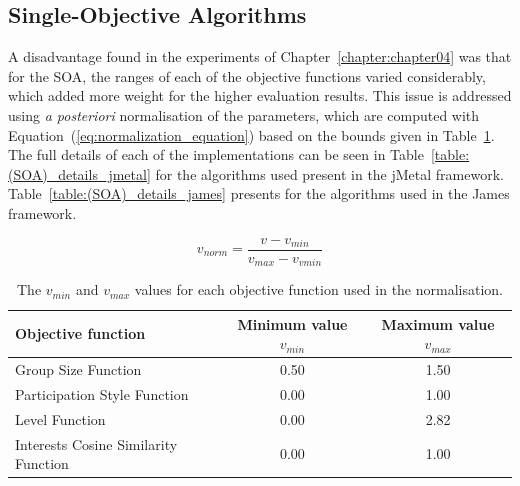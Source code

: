 \subsection{Single-Objective Algorithms}
\label{sub:soa_implementation}

A disadvantage found in the experiments of Chapter~\ref{chapter:chapter04} was that for the SOA, the ranges of each of the objective functions varied considerably, which added more weight for the higher evaluation results. This issue is addressed using {\em a posteriori} normalisation of the parameters, which are computed with Equation~(\ref{eq:normalization_equation}) based on the bounds given in Table~\ref{table:normalization_parameters}. \\

The full details of each of the implementations can be seen in Table~\ref{table:(SOA)_details_jmetal} for the algorithms used present in the jMetal framework.  Table~\ref{table:(SOA)_details_james} presents for the algorithms used in the James framework.

\begin{equation}
    v_{norm} = \frac{v- v_{min}}{v_{max} - v_{vmin}} 
    \label{eq:normalization_equation}
\end{equation}

\begin{table}[H]
    \begin{tabular}{lcc}
    \hline
    Objective function & Minimum value $v_{min}$ & Maximum value $v_{max}$ \\
    \hline
    Group Size Function                  & 0.50  & 1.50 \\
    Participation Style Function         & 0.00  & 1.00 \\
    Level Function                       & 0.00  & 2.82 \\
    Interests Cosine Similarity Function & 0.00  & 1.00 \\
    \hline
    \end{tabular}
    \caption{The $v_{min}$ and $v_{max}$ values for each objective function used in the normalisation.}
    \label{table:normalization_parameters}
\end{table}

